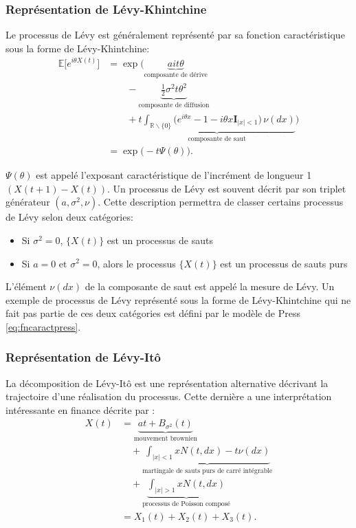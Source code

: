 \subsubsection{Représentation de Lévy-Khintchine}
\label{sec:levykhintchine}

Le processus de Lévy est généralement représenté par sa fonction
caractéristique sous la forme de Lévy-Khintchine:
\begin{align}
  \mathbb{E}\Big[e^{i\theta X(t)} \Big] &= \exp \Bigg(
  \underbrace{ait\theta}_{\text{composante de dérive}} \nonumber\\
  &\qquad -
  \underbrace{\frac{1}{2}\sigma^2t\theta^2}_{\text{composante de
      diffusion}} \nonumber\\ &\qquad + \underbrace{t
    \int_{\mathbb{R}\backslash\{0\}} \big( e^{i\theta x}-1 -i\theta x \mathbf{I}_{|x|<1}\big)\,\nu(dx)}_{\text{composante de saut}} \Bigg)\label{eq:levykhintchine}\\
  &= \exp \bigg(-t\Psi(\theta) \bigg).
\end{align}

$\Psi(\theta)$ est appelé l'exposant caractéristique de l'incrément de
longueur 1 $(X(t+1)-X(t))$. Un processus de Lévy est souvent décrit
par son triplet générateur $(a,\sigma^2,\nu)$. Cette description
permettra de classer certains processus de Lévy selon deux catégories:
\begin{itemize}
\item Si $\sigma^2=0$, $\lbrace X(t) \rbrace$ est un processus de
  sauts
\item Si $a=0 \mbox{ et } \sigma^2=0$, alors le processus $\lbrace
  X(t) \rbrace$ est un processus de sauts purs
\end{itemize}

L'élément $\nu(dx)$ de la composante de saut est appelé la mesure de
Lévy.  Un exemple de processus de Lévy représenté sous la forme de
Lévy-Khintchine qui ne fait pas partie de ces deux catégories est
défini par le modèle de Press \eqref{eq:fncaractpress}.

\subsubsection{Représentation de Lévy-Itô}
\label{sec:levyito}
La décomposition de Lévy-Itô est une représentation alternative
décrivant la trajectoire d'une réalisation du processus. Cette
dernière a une interprétation intéressante en finance décrite par
\cite{applebaum2004levy}:
\begin{align}
  \label{eq:levyitodecomposition}
  X(t) &= \underbrace{at + B_{\sigma^2}(t)}_{\text{mouvement brownien}} \nonumber\\ &\quad+ \underbrace{\int_{|x|<1}x N(t,dx)-t\nu(dx)}_{\text{martingale de sauts purs  de carré intégrable}} \nonumber\\ &\quad+ \underbrace{\int_{|x|>1}x N(t,dx)}_{\text{processus de Poisson composé}} \\
  &= X_1(t) + X_2(t) + X_3(t).
\end{align}


